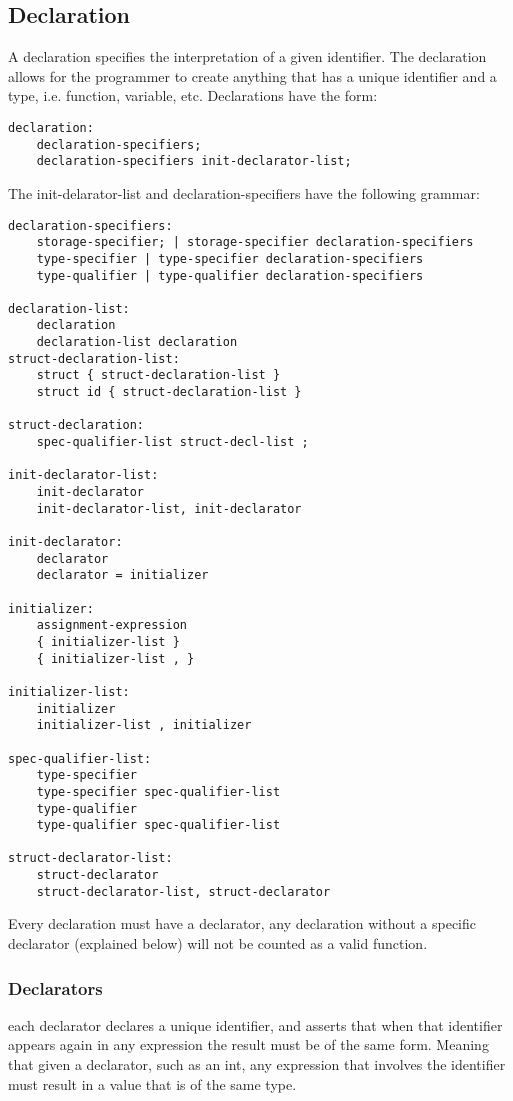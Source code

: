 \documentclass[./LRM_main.tex]{subfiles}
\begin{document}
\subsection{Declaration}
A declaration specifies the interpretation of a given identifier. The declaration allows for the programmer to create anything that has a unique identifier and a type, i.e. function, variable, etc. Declarations have the form:
\begin{lstlisting}
declaration:
	declaration-specifiers;
	declaration-specifiers init-declarator-list;
\end{lstlisting}
The init-delarator-list and declaration-specifiers have the following grammar:
\begin{lstlisting}
declaration-specifiers:
	storage-specifier; | storage-specifier declaration-specifiers
	type-specifier | type-specifier declaration-specifiers
	type-qualifier | type-qualifier declaration-specifiers
	
declaration-list:
	declaration
	declaration-list declaration
struct-declaration-list:
	struct { struct-declaration-list }
	struct id { struct-declaration-list }

struct-declaration:
	spec-qualifier-list struct-decl-list ;

init-declarator-list:
	init-declarator
	init-declarator-list, init-declarator
	
init-declarator:
	declarator
	declarator = initializer

initializer:
	assignment-expression
	{ initializer-list }
	{ initializer-list , }

initializer-list:
	initializer
	initializer-list , initializer

spec-qualifier-list:
	type-specifier
	type-specifier spec-qualifier-list
	type-qualifier
	type-qualifier spec-qualifier-list

struct-declarator-list:
	struct-declarator
	struct-declarator-list, struct-declarator
\end{lstlisting}
Every declaration must have a declarator, any declaration without a specific declarator (explained below) will not be counted as a valid function.
\subsubsection{Declarators}
each declarator declares a unique identifier, and asserts that when that identifier appears again in any expression the result must be of the same form. Meaning that given a declarator, such as an int, any expression that involves the identifier must result in a value that is of the same type.
\end{document}
